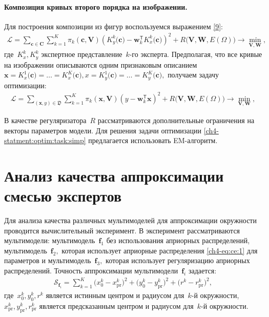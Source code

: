 \paragraph{Композиция кривых второго порядка на изображении.}
Для построения композиции из фигур воспользуемся выражением \eqref{9}:
\[ 
\label{ch4-statment:optim:task}
\begin{aligned}
\mathcal{L} = \sum\limits_{\mathbf{c} \in \mathbf{C}} \sum\limits_{k = 1}^{K} \pi_k(\mathbf{c}, \mathbf{V})\left(K^{k}_y\bigr(\mathbf{c}\bigr) - \mathbf{w}_k^{\mathsf{T}}K^{k}_x\bigr(\mathbf{c}\bigr)\right)^2 + R\bigl(\mathbf{V}, \mathbf{W}, E(\Omega)\bigr) \rightarrow \min_{\mathbf{V}, \mathbf{W}},
\end{aligned}
\] 
где~$K^{k}_x, K^{k}_y$ экспертное представление~$k$-го эксперта. Предполагая, что все кривые на изображении описываются одним признаковым описанием~$\mathbf{x} =K^{1}_x\bigr(\mathbf{c}\bigr)=\ldots=K^{K}_x\bigr(\mathbf{c}\bigr), x= K^{1}_y\bigr(\mathbf{c}\bigr)=\ldots=K^{K}_y\bigr(\mathbf{c}\bigr),$ получаем задачу оптимизации:
\[ 
\label{ch4-statment:optim:task:simp}
\begin{aligned}
\mathcal{L} = \sum\limits_{\left(\mathbf{x}, y\right) \in \mathfrak{D}} \sum\limits_{k = 1}^{K} \pi_k(\mathbf{x}, \mathbf{V})\left(y - \mathbf{w}_k^{\mathsf{T}}\mathbf{x}\right)^2 + R\bigl(\mathbf{V}, \mathbf{W}, E(\Omega)\bigr) \rightarrow \min_{\mathbf{V}, \mathbf{W}},
\end{aligned}
\] 

В качестве регуляризатора~$R$ рассматриваются дополнительные ограничения на векторы параметров модели. Для решения задачи оптимизации \eqref{ch4-statment:optim:task:simp} предлагается использовать EM-алгоритм.

\section{Анализ качества аппроксимации смесью экспертов}
Для анализа качества различных мультимоделей для аппроксимации окружности проводится вычислительный эксперимент.
В эксперимент рассматриваются мультимодели: мультимодель~$\textbf{f}_1$ без использования априорных распределений, мультимодель~$\textbf{f}_2,$ которая использует априорные распределения \eqref{ch4-eq:ce:1} для параметров и мультимодель~$\textbf{f}_3,$ которая использует регуляризацию априорных распределений.
Точность аппроксимации мультимодели~$\textbf{f}_i$ задается:
\[
\label{ch4-eq:ce:ex:0:1}
\begin{aligned}
\mathcal{S}_{\textbf{f}_i} = \sum_{k=1}^{K}\bigr(x^{k}_{0}-x^{k}_{\text{pr}}\bigr)^2+\bigr(y^{k}_{0}-y^{k}_{\text{pr}}\bigr)^2+\bigr(r^{k}-r^{k}_{\text{pr}}\bigr)^2,
\end{aligned}
\]
где~$x^{k}_0, y^{k}_0, r^{k}$ является истинным центром и радиусом для~$k$-й окружности,~$x^{k}_{\text{pr}}, y^{k}_{\text{pr}}, r^{k}_{\text{pr}}$ является предсказанным центром и радиусом для~$k$-й окружности.


